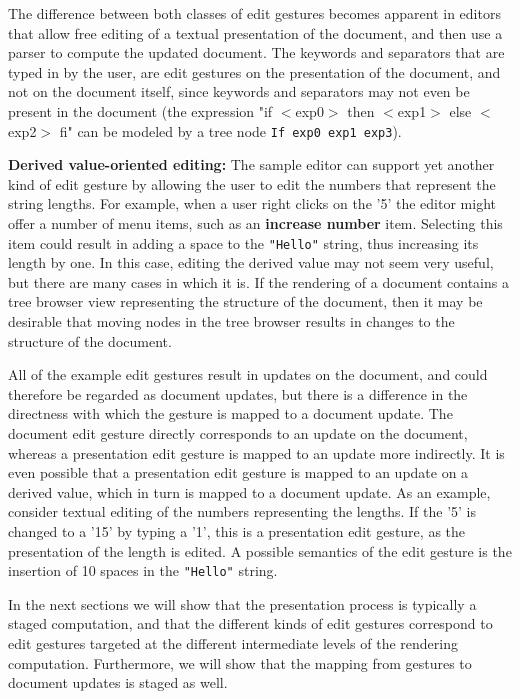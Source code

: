 The difference between both classes of edit gestures becomes apparent in editors that allow free editing of a textual presentation of the document, and then use a parser to compute the updated document. The keywords and separators that are typed in by the user, are edit gestures on the presentation of the document, and not on the document itself, since keywords and separators may not even be present in the document (the expression "if $<$exp0$>$ then $<$exp1$>$ else $<$exp2$>$ fi" can be modeled by a tree node \texttt{If exp0 exp1 exp3}).

{\bf Derived value-oriented editing: }The sample editor can support yet another kind of edit gesture by allowing the user to edit the numbers that represent the string lengths. For example, when a user right clicks on the '5' the editor might offer a number of menu items, such as an {\bf increase number} item. Selecting this item could result in adding a space to the \texttt{"Hello"} string, thus increasing its length by one. In this case, editing the derived value may not seem very useful, but there are many cases in which it is. If the rendering of a document contains a tree browser view representing the structure of the document, then it may be desirable that moving nodes in the tree browser results in changes to the structure of the document.

\bigskip All of the example edit gestures result in updates on the document, and could therefore be regarded as document updates, but there is a difference in the directness with which the gesture is mapped to a document update. The document edit gesture directly corresponds to an update on the document, whereas a presentation edit gesture is mapped to an update more indirectly. It is even possible that a presentation edit gesture is mapped to an update on a derived value, which in turn is mapped to a document update. As an example, consider textual editing of the numbers representing the lengths. If the '5' is changed to a '15' by typing a '1', this is a presentation edit gesture, as the presentation of the length is edited. A possible semantics of the edit gesture is the insertion of 10 spaces in the \texttt{"Hello"} string.

In the next sections we will show that the presentation process is typically a staged computation, and that the different kinds of edit gestures correspond to edit gestures targeted at the different intermediate levels of the rendering computation. Furthermore, we will show that the mapping from gestures to document updates is staged as well. 

